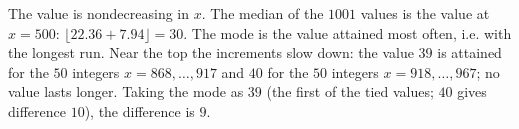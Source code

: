 The value is nondecreasing in $x$. The median of the $1001$ values is the value at $x=500$: $\lfloor22.36+7.94\rfloor=30$. The mode is the value attained most often, i.e. with the longest run. Near the top the increments slow down: the value $39$ is attained for the $50$ integers $x=868,\dots,917$ and $40$ for the $50$ integers $x=918,\dots,967$; no value lasts longer. Taking the mode as $39$ (the first of the tied values; $40$ gives difference $10$), the difference is $\boxed{9}$.
